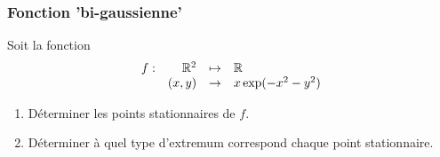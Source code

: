 \subsubsection{Fonction 'bi-gaussienne' \todo{}}

Soit la fonction 
$$
\begin{array}{rrcl}
  f : & \mathbb{R}^2 & \mapsto & \mathbb{R} \\
  & (x, y) & \to & x \exp(-x^2 - y^2)
\end{array}
$$

\begin{enumerate}
  \item Déterminer les points stationnaires de $f$.
  \item Déterminer à quel type d'extremum correspond chaque point stationnaire.
  \solution{
    \todo{}
  }
\end{enumerate}
